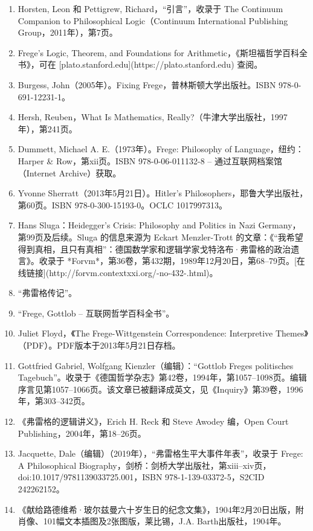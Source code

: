 \begin{enumerate}
\item Horsten, Leon 和 Pettigrew, Richard，“引言”，收录于 The Continuum Companion to Philosophical Logic（Continuum International Publishing Group，2011年），第7页。  
\item Frege's Logic, Theorem, and Foundations for Arithmetic，《斯坦福哲学百科全书》，可在 [plato.stanford.edu](https://plato.stanford.edu) 查阅。  
\item Burgess, John（2005年）。Fixing Frege，普林斯顿大学出版社。ISBN 978-0-691-12231-1。  
\item Hersh, Reuben，What Is Mathematics, Really?（牛津大学出版社，1997年），第241页。  
\item Dummett, Michael A. E.（1973年）。Frege: Philosophy of Language，纽约：Harper & Row，第xii页。ISBN 978-0-06-011132-8 – 通过互联网档案馆（Internet Archive）获取。  
\item Yvonne Sherratt（2013年5月21日）。Hitler's Philosophers，耶鲁大学出版社，第60页。ISBN 978-0-300-15193-0。OCLC 1017997313。  
\item Hans Sluga：Heidegger's Crisis: Philosophy and Politics in Nazi Germany，第99页及后续。Sluga 的信息来源为 Eckart Menzler-Trott 的文章：《“我希望得到真相，且只有真相”：德国数学家和逻辑学家戈特洛布·弗雷格的政治遗言》。收录于 *Forvm*，第36卷，第432期，1989年12月20日，第68–79页。[在线链接](http://forvm.contextxxi.org/-no-432-.html)。
\item “弗雷格传记”。  
\item “Frege, Gottlob – 互联网哲学百科全书”。  
\item Juliet Floyd，《The Frege-Wittgenstein Correspondence: Interpretive Themes》（PDF）。PDF版本于2013年5月21日存档。  
\item Gottfried Gabriel, Wolfgang Kienzler（编辑）：“Gottlob Freges politisches Tagebuch”。收录于《德国哲学杂志》第42卷，1994年，第1057–1098页。编辑序言见第1057–1066页。该文章已被翻译成英文，见《Inquiry》第39卷，1996年，第303–342页。  
\item 《弗雷格的逻辑讲义》，Erich H. Reck 和 Steve Awodey 编，Open Court Publishing，2004年，第18–26页。  
\item Jacquette, Dale（编辑）（2019年），“弗雷格生平大事件年表”，收录于 Frege: A Philosophical Biography，剑桥：剑桥大学出版社，第xiii–xiv页，doi:10.1017/9781139033725.001，ISBN 978-1-139-03372-5，S2CID 242262152。  
\item 《献给路德维希·玻尔兹曼六十岁生日的纪念文集》，1904年2月20日出版，附肖像、101幅文本插图及2张图版，莱比锡，J.A. Barth出版社，1904年。
\end{enumerate}
